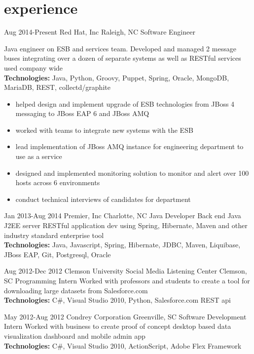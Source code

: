 
\section{experience}

\begin{entrylist}


\workentry
{Aug 2014-Present}
{Red Hat, Inc}
{Raleigh, NC}
{Software Engineer}
{Java engineer on ESB and services team. Developed and managed 2 message buses integrating over a dozen of separate systems as well as RESTful services used company wide \\
\textbf{Technologies:} Java, Python, Groovy, Puppet, Spring, Oracle, MongoDB, MariaDB, REST, collectd/graphite
\begin{itemize}
\item helped design and implement upgrade of ESB technologies from JBoss 4 messaging to JBoss EAP 6 and JBoss AMQ
\item worked with teams to integrate new systems with the ESB
\item lead implementation of JBoss AMQ instance for engineering department to use as a service
\item designed and implemented monitoring solution to monitor and alert over 100 hosts across 6 environments
\item conduct technical interviews of candidates for department
\end{itemize}}

\workentry
{Jan 2013-Aug 2014}
{Premier, Inc}
{Charlotte, NC}
{Java Developer}
{Back end Java J2EE server RESTful application dev using Spring, Hibernate, Maven and other industry standard enterprise tool \\
\textbf{Technologies:} Java, Javascript, Spring, Hibernate, JDBC, Maven, Liquibase, JBoss EAP, Git, Postgresql, Oracle}

\workentry
{Aug 2012-Dec 2012}
{Clemson University Social Media Listening Center}
{Clemson, SC}
{Programming Intern}
{Worked with professors and students to create a tool for downloading large datasets from Salesforce.com \\
\textbf{Technologies:} C\#, Visual Studio 2010, Python, Salesforce.com REST api}

\workentry
{May 2012-Aug 2012}
{Condrey Corporation}
{Greenville, SC}
{Software Development Intern}
{Worked with business to create proof of concept desktop based data visualization dashboard and mobile admin app \\
\textbf{Technologies:} C\#, Visual Studio 2010, ActionScript, Adobe Flex Framework}


\end{entrylist}
